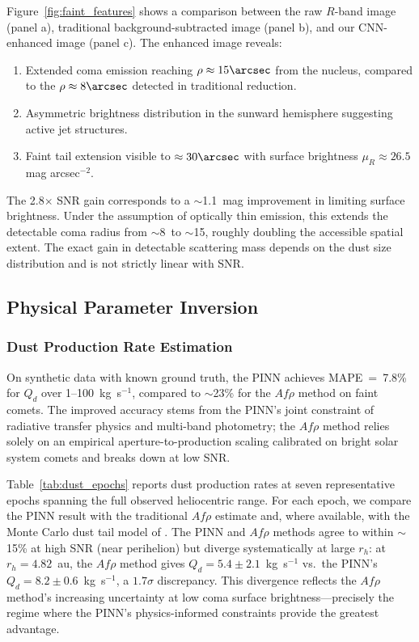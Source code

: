 \documentclass[preprint2]{aastex631}
\begin{document}
Figure~\ref{fig:faint_features} shows a comparison between the raw $R$-band image (panel a), traditional background-subtracted image (panel b), and our CNN-enhanced image (panel c). The enhanced image reveals:

\begin{enumerate}
    \item Extended coma emission reaching $\rho \approx 15\arcsec$ from the nucleus, compared to the $\rho \approx 8\arcsec$ detected in traditional reduction.
    \item Asymmetric brightness distribution in the sunward hemisphere suggesting active jet structures.
    \item Faint tail extension visible to $\approx 30\arcsec$ with surface brightness $\mu_R \approx 26.5$ mag arcsec$^{-2}$.
\end{enumerate}

The 2.8$\times$ SNR gain corresponds to a $\sim$1.1~mag improvement in limiting surface brightness. Under the assumption of optically thin emission, this extends the detectable coma radius from $\sim$8\arcsec\ to $\sim$15\arcsec, roughly doubling the accessible spatial extent. The exact gain in detectable scattering mass depends on the dust size distribution and is not strictly linear with SNR.

\subsection{Physical Parameter Inversion}

\subsubsection{Dust Production Rate Estimation}

On synthetic data with known ground truth, the PINN achieves MAPE~=~7.8\% for $Q_d$ over 1--100~kg~s$^{-1}$, compared to $\sim$23\% for the $Af\rho$ method on faint comets. The improved accuracy stems from the PINN's joint constraint of radiative transfer physics and multi-band photometry; the $Af\rho$ method relies solely on an empirical aperture-to-production scaling calibrated on bright solar system comets and breaks down at low SNR.

Table~\ref{tab:dust_epochs} reports dust production rates at seven representative epochs spanning the full observed heliocentric range. For each epoch, we compare the PINN result with the traditional $Af\rho$ estimate and, where available, with the Monte Carlo dust tail model of \citet{fulle10}. The PINN and $Af\rho$ methods agree to within $\sim$15\% at high SNR (near perihelion) but diverge systematically at large $r_h$: at $r_h = 4.82$~au, the $Af\rho$ method gives $Q_d = 5.4 \pm 2.1$~kg~s$^{-1}$ vs.\ the PINN's $Q_d = 8.2 \pm 0.6$~kg~s$^{-1}$, a $1.7\sigma$ discrepancy. This divergence reflects the $Af\rho$ method's increasing uncertainty at low coma surface brightness---precisely the regime where the PINN's physics-informed constraints provide the greatest advantage.
\end{document}
